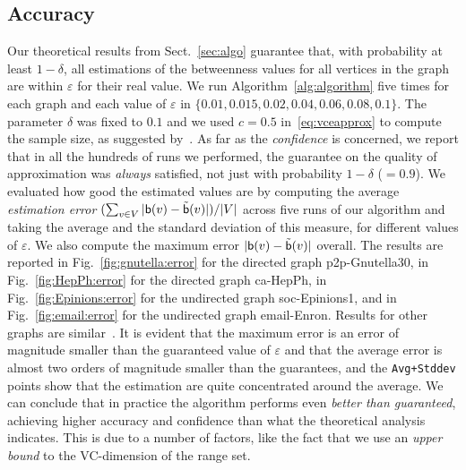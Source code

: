 \subsection{Accuracy}\label{sec:accuracy}
Our theoretical results from Sect.~\ref{sec:algo} guarantee that, with probability
at least $1-\delta$, all estimations of the betweenness values for all vertices
in the graph are within $\varepsilon$ for their real value. %
We run Algorithm~\ref{alg:algorithm} five times for each graph and each value of
$\varepsilon$ in $\{0.01, 0.015, 0.02, 0.04, 0.06, 0.08, 0.1\}$. The parameter
$\delta$ was fixed to $0.1$ and we used $c=0.5$ in~\eqref{eq:vceapprox} to
compute the sample size, as suggested by~\citet{LofflerP09}. As far as the
\emph{confidence} is concerned, we report that in all the hundreds of runs we
performed, the guarantee on the quality of approximation was \emph{always} satisfied, not just
with probability $1-\delta$ ($=0.9$). We evaluated how good the estimated values
are by computing the average \emph{estimation error} $(\sum_{v\in
V}|\mathsf{b}(v)-\tilde{\mathsf{b}}(v)|)/|V|$ across five runs of our algorithm and taking
the average and the standard deviation of this measure, for different values of
$\varepsilon$. We also compute the maximum error $|\mathsf{b}(v)-\tilde{\mathsf{b}}(v)|$
overall. The results are reported in Fig.~\ref{fig:gnutella:error} for the directed
graph p2p-Gnutella30, %
\ifproof
in Fig.~\ref{fig:HepPh:error} for the directed graph ca-HepPh, in
Fig.~\ref{fig:Epinions:error} for the undirected graph soc-Epinions1, %
\fi
and in Fig.~\ref{fig:email:error} for the undirected graph
email-Enron. %
\ifproof
\else
Results for other graphs are similar~\citep{RiondatoK13}. %
\fi
It is
evident that the maximum error is an error of magnitude smaller than the
guaranteed value of $\varepsilon$ and that the average error is almost two
orders of magnitude smaller than the guarantees, and the \texttt{Avg+Stddev}
points show that the estimation are quite concentrated around the
average. We can conclude that in practice the algorithm performs even \emph{better
than guaranteed}, achieving higher accuracy and confidence than what the
theoretical analysis indicates. This is due to a number of factors, like the
fact that we use an \emph{upper bound} to the VC-dimension of the range set. 

